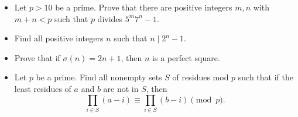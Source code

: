 \begin{itemize}
  \item Let $p>10$ be a prime. Prove that there are positive integers $m,n$ with
    $m+n<p$ such that $p$ divides $5^m7^n-1$.
  \item Find all positive integers $n$ such that $n\mid 2^n-1$.
  \item Prove that if $\sigma(n)=2n+1$, then $n$ is a perfect square.
  \item Let $p$ be a prime. Find all nonempty sets $S$ of residues mod $p$ such
    that if the least residues of $a$ and $b$ are not in $S$, then \[\prod_{i\in S}(a-i)\equiv\prod_{i\in S}(b-i)\pmod
    p.\]
\end{itemize}
